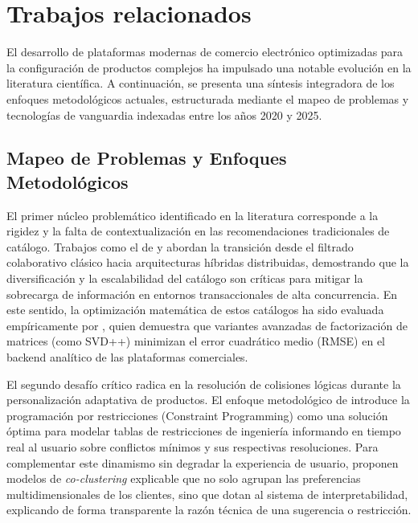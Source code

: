\documentclass[12pt]{article}
\begin{document}
    \section{Trabajos relacionados}

    El desarrollo de plataformas modernas de comercio electrónico optimizadas para la configuración de productos complejos ha impulsado una notable evolución en la literatura científica. A continuación, se presenta una síntesis integradora de los enfoques metodológicos actuales, estructurada mediante el mapeo de problemas y tecnologías de vanguardia indexadas entre los años 2020 y 2025.

    \subsection{Mapeo de Problemas y Enfoques Metodológicos}

    El primer núcleo problemático identificado en la literatura corresponde a la rigidez y la falta de contextualización en las recomendaciones tradicionales de catálogo. Trabajos como el de \textcite{vinayababu2025revolutionizing} y \textcite{khadka2025review} abordan la transición desde el filtrado colaborativo clásico hacia arquitecturas híbridas distribuidas, demostrando que la diversificación y la escalabilidad del catálogo son críticas para mitigar la sobrecarga de información en entornos transaccionales de alta concurrencia. En este sentido, la optimización matemática de estos catálogos ha sido evaluada empíricamente por \textcite{tokala2025empirical}, quien demuestra que variantes avanzadas de factorización de matrices (como SVD++) minimizan el error cuadrático medio (RMSE) en el backend analítico de las plataformas comerciales.

    El segundo desafío crítico radica en la resolución de colisiones lógicas durante la personalización adaptativa de productos. El enfoque metodológico de \textcite{velten2025solutions} introduce la programación por restricciones (Constraint Programming) como una solución óptima para modelar tablas de restricciones de ingeniería informando en tiempo real al usuario sobre conflictos mínimos y sus respectivas resoluciones. Para complementar este dinamismo sin degradar la experiencia de usuario, \textcite{benncir2025new} proponen modelos de \textit{co-clustering} explicable que no solo agrupan las preferencias multidimensionales de los clientes, sino que dotan al sistema de interpretabilidad, explicando de forma transparente la razón técnica de una sugerencia o restricción.
\end{document}
